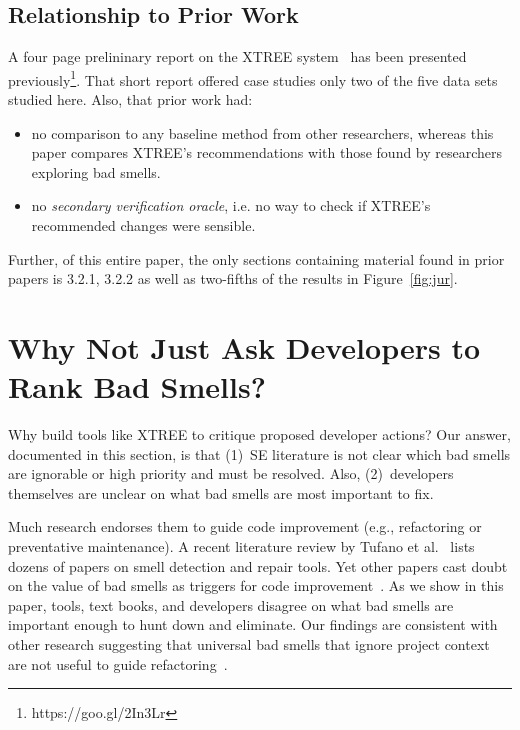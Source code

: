 \documentclass[twocolumn,5p]{elsarticle}
\newcommand{\bi}{\begin{itemize}[leftmargin=0.4cm]}
\newcommand{\ei}{\end{itemize}}
\newcommand{\fig}[1]{Figure~\ref{fig:#1}}
\theoremstyle{break}
\begin{document}
  \subsection{Relationship to Prior Work }
A four page prelininary report on the XTREE system~\cite{krishna2015actionable} has been presented previously\footnote{https://goo.gl/2In3Lr}. That short report offered case studies only two  of
the five data sets studied here. Also, that prior work had:
\bi
\item
no comparison to any baseline
method from other researchers, whereas this paper compares XTREE's recommendations
with those found by researchers exploring bad smells.
\item
no {\em secondary verification oracle}, i.e. no way to check if XTREE's recommended changes were sensible.
\ei
Further, of this entire paper, the only sections containing material
found in prior papers is 3.2.1, 3.2.2 as well as two-fifths of the results in \fig{jur}. 



\section{Why Not Just Ask Developers to Rank Bad Smells?}\label{sect:prelim}

Why build tools like XTREE to  critique proposed developer actions?
Our answer, documented in this section, is that (1)~SE literature is not clear which bad smells are ignorable or  high priority and must be resolved.
Also, (2)~developers themselves are unclear on what bad smells are most important to fix.
 
 
Much research endorses them to guide
code improvement (e.g., refactoring or preventative maintenance). A recent literature review by Tufano et al.~\cite{Tufano2015}  
lists dozens of papers on smell detection and repair tools. 
Yet
other papers cast doubt on the value of bad smells
as triggers for code improvement~\cite{Mantyla2004,Yamashita2013,Sjoberg2013}. 
As we show in this paper,  
 tools, text books, and developers disagree on what bad smells
are important enough to hunt down and eliminate. Our findings
are consistent with other research suggesting that universal bad
smells that ignore project context are not useful to guide refactoring~\cite{Mantyla2004,Yamashita2013,Sjoberg2013}.
\end{document}
